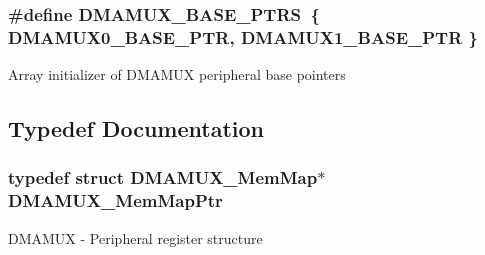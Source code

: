\subsubsection[{D\+M\+A\+M\+U\+X\+\_\+\+B\+A\+S\+E\+\_\+\+P\+T\+R\+S}]{\setlength{\rightskip}{0pt plus 5cm}\#define D\+M\+A\+M\+U\+X\+\_\+\+B\+A\+S\+E\+\_\+\+P\+T\+R\+S~\{ {\bf D\+M\+A\+M\+U\+X0\+\_\+\+B\+A\+S\+E\+\_\+\+P\+T\+R}, {\bf D\+M\+A\+M\+U\+X1\+\_\+\+B\+A\+S\+E\+\_\+\+P\+T\+R} \}}\label{group___d_m_a_m_u_x___peripheral_gaad218c12978071501dc2899f0624de4b}
Array initializer of D\+M\+A\+M\+U\+X peripheral base pointers 

\subsection{Typedef Documentation}
\hypertarget{group___d_m_a_m_u_x___peripheral_ga736ab5b1ed284b3b4fdb63010a576777}{}
\subsubsection[{D\+M\+A\+M\+U\+X\+\_\+\+Mem\+Map\+Ptr}]{\setlength{\rightskip}{0pt plus 5cm}typedef struct {\bf D\+M\+A\+M\+U\+X\+\_\+\+Mem\+Map}$\ast$ {\bf D\+M\+A\+M\+U\+X\+\_\+\+Mem\+Map\+Ptr}}\label{group___d_m_a_m_u_x___peripheral_ga736ab5b1ed284b3b4fdb63010a576777}
D\+M\+A\+M\+U\+X -\/ Peripheral register structure 